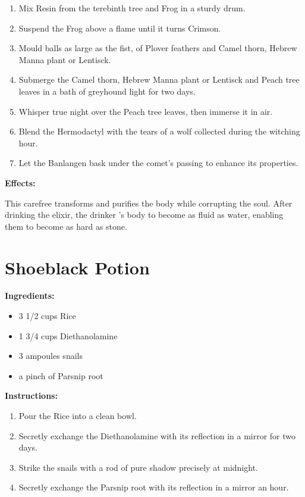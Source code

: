 \documentclass{article}
\begin{document}
\begin{enumerate}
  \item Mix Resin from the terebinth tree and Frog in a sturdy drum.
  \item Suspend the Frog above a flame until it turns Crimson.
  \item Mould balls as large as the fist, of Plover feathers and Camel thorn, Hebrew Manna plant  or Lentisck.
  \item Submerge the Camel thorn, Hebrew Manna plant  or Lentisck and Peach tree leaves in a bath of greyhound light for two days.
  \item Whisper true night over the Peach tree leaves, then immerse it in air.
  \item Blend the Hermodactyl with the tears of a wolf collected during the witching hour.
  \item Let the Banlangen bask under the comet’s passing to enhance its properties.
\end{enumerate}

\textbf{Effects:}

This carefree transforms and purifies the body while corrupting the soul. After drinking the elixir, the drinker 's body to become as fluid as water, enabling them to become as hard as stone.

\newpage
\section*{Shoeblack Potion}

\textbf{Ingredients:}

\begin{itemize}
  \item 3 1/2 cups Rice
  \item 1 3/4 cups Diethanolamine
  \item 3 ampoules snails
  \item a pinch of Parsnip root
\end{itemize}

\textbf{Instructions:}

\begin{enumerate}
  \item Pour the Rice into a clean bowl.
  \item Secretly exchange the Diethanolamine with its reflection in a mirror for two days.
  \item Strike the snails with a rod of pure shadow precisely at midnight.
  \item Secretly exchange the Parsnip root with its reflection in a mirror an hour.
\end{enumerate}
\end{document}
